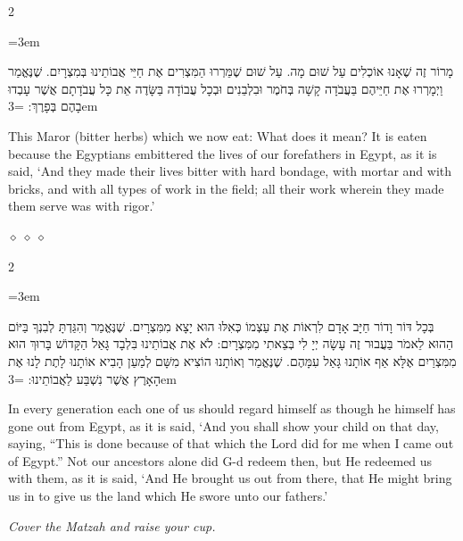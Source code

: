 \documentclass[11pt, openany]{book}
\newcommand{\instruction}[1]{%
  \par\vspace{3pt}
  \begin{tcolorbox}[
    enhanced,
    breakable,
    colback=sederlight,
    colframe=sederlight,
    boxrule=0pt,
    left=10pt,
    right=6pt,
    top=4pt,
    bottom=4pt,
    borderline west={2pt}{0pt}{sederwine!60},
    arc=0pt,
    outer arc=0pt,
  ]
    {\small\itshape\textcolor{sederwine}{#1}}
  \end{tcolorbox}
  \par\vspace{2pt}
}
\newcommand{\sederdivider}{%
  \par\vspace{6pt}
  \begin{center}
    \textcolor{sedergold}{\pgfornament[width=1.5cm]{11}}
  \end{center}
  \par\vspace{6pt}
}
\newenvironment{bilingual}{%
  \par\vspace{4pt}%
  \begin{paracol}{2}%
}{%
  \end{paracol}%
  \par\vspace{2pt}%
}
\newenvironment{hebrewcol}{%
  \switchcolumn[1]%
  \begingroup
  \RTL
  \hebrewfont\large
  \setstretch{1.4}%
  \emergencystretch=3em
  \tolerance=9999
  \parindent=0pt\relax
}{%
  \endRTL
  \endgroup
}
\newenvironment{englishcol}{%
  \switchcolumn[0]%
  \begingroup
  \setstretch{1.4}%
  \emergencystretch=3em
  \tolerance=9999
  \normalsize
  \rightskip=0.12in\relax
}{%
  \endgroup
}
\newcommand{\parasep}{%
  \par\vspace{3pt}
  \begin{center}
    \textcolor{sedergold!50}{\tiny$\diamond\;\diamond\;\diamond$}
  \end{center}
  \par\vspace{3pt}
}
\begin{document}
\begin{bilingual}
\begin{hebrewcol}
מָרוֹר זֶה שֶׁאָנוּ אוֹכְלִים עַל שׁוּם מָה. עַל שׁוּם שֶׁמֵּרְרוּ הַמִּצְרִים אֶת חַיֵּי אֲבוֹתֵינוּ בְּמִצְרָיִם. שֶׁנֶּאֱמַר וַיְמָרְרוּ אֶת חַיֵּיהֶם בַּעֲבֹדָה קָשָׁה בְּחֹמֶר וּבִלְבֵנִים וּבְכָל עֲבוֹדָה בַּשָּׂדֶה אֵת כָּל עֲבֹדָתָם אֲשֶׁר עָבְדוּ בָהֶם בְּפָרֶךְ:
\end{hebrewcol}
\begin{englishcol}
This Maror (bitter herbs) which we now eat: What does it mean? It is eaten because the Egyptians embittered the lives of our forefathers in Egypt, as it is said, `And they made their lives bitter with hard bondage, with mortar and with bricks, and with all types of work in the field; all their work wherein they made them serve was with rigor.'
\end{englishcol}
\end{bilingual}
\parasep

\begin{bilingual}
\begin{hebrewcol}
בְּכָל דּוֹר וָדוֹר חַיָּב אָדָם לִרְאוֹת אֶת עַצְמוֹ כְּאִלּוּ הוּא יָצָא מִמִּצְרָיִם. שֶׁנֶּאֱמַר וְהִגַּדְתָּ לְבִנְךָ בַּיּוֹם הַהוּא לֵאמֹר בַּעֲבוּר זֶה עָשָׂה יְיָ לִי בְּצֵאתִי מִמִּצְרָיִם: לֹא אֶת אֲבוֹתֵינוּ בִּלְבָד גָּאַל הַקָּדוֹשׁ בָּרוּךְ הוּא מִמִּצְרַיִם אֶלָּא אַף אוֹתָנוּ גָּאַל עִמָּהֶם. שֶׁנֶּאֱמַר וְאוֹתָנוּ הוֹצִיא מִשָּׁם לְמַעַן הָבִיא אוֹתָנוּ לָתֶת לָנוּ אֶת הָאָרֶץ אֲשֶׁר נִשְׁבַּע לַאֲבוֹתֵינוּ:
\end{hebrewcol}
\begin{englishcol}
In every generation each one of us should regard himself as though he himself has gone out from Egypt, as it is said, `And you shall show your child on that day, saying, ``This is done because of that which the Lord did for me when I came out of Egypt.'' Not our ancestors alone did G-d redeem then, but He redeemed us with them, as it is said, `And He brought us out from there, that He might bring us in to give us the land which He swore unto our fathers.'
\end{englishcol}
\end{bilingual}
\sederdivider

\instruction{Cover the Matzah and raise your cup.}
\end{document}
